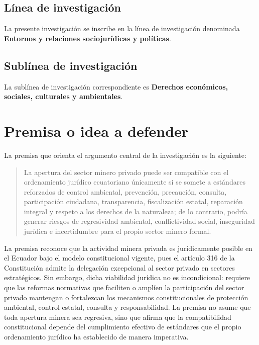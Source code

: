 \subsection{Línea de investigación}

La presente investigación se inscribe en la línea de investigación denominada \textbf{Entornos y relaciones sociojurídicas y políticas}.

\subsection{Sublínea de investigación}

La sublínea de investigación correspondiente es \textbf{Derechos económicos, sociales, culturales y ambientales}.

\section{Premisa o idea a defender}

La premisa que orienta el argumento central de la investigación es la siguiente:

\begin{quote}
La apertura del sector minero privado puede ser compatible con el ordenamiento jurídico ecuatoriano únicamente si se somete a estándares reforzados de control ambiental, prevención, precaución, consulta, participación ciudadana, transparencia, fiscalización estatal, reparación integral y respeto a los derechos de la naturaleza; de lo contrario, podría generar riesgos de regresividad ambiental, conflictividad social, inseguridad jurídica e incertidumbre para el propio sector minero formal.
\end{quote}

La premisa reconoce que la actividad minera privada es jurídicamente posible en el Ecuador bajo el modelo constitucional vigente, pues el artículo 316 de la Constitución admite la delegación excepcional al sector privado en sectores estratégicos. Sin embargo, dicha viabilidad jurídica no es incondicional: requiere que las reformas normativas que faciliten o amplíen la participación del sector privado mantengan o fortalezcan los mecanismos constitucionales de protección ambiental, control estatal, consulta y responsabilidad. La premisa no asume que toda apertura minera sea regresiva, sino que afirma que la compatibilidad constitucional depende del cumplimiento efectivo de estándares que el propio ordenamiento jurídico ha establecido de manera imperativa.

